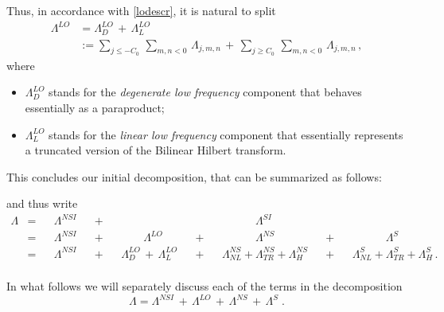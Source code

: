 \documentclass[a4paper,reqno]{amsart}
\numberwithin{equation}{section}
\theoremstyle{definition}
\def\L{\Lambda}
\begin{document}
Thus, in accordance with \eqref{lodescr}, it is natural to split
\begin{align}
\L^{LO} &=\L^{LO}_{D}\,+\,\L^{LO}_L\label{llo}\\[1ex]
&:=\sum_{j\le -C_0}\,\sum_{m,n<0}\, \L_{j,m,n}\,+\,\sum_{j\ge C_0}\,\sum_{m,n<0}\, \L_{j,m,n}\,,\nonumber
\end{align}
where
\begin{itemize}
\item $\L^{LO}_{D}$ stands for the \emph{degenerate low frequency} component that behaves essentially as a paraproduct;

\item $\L^{LO}_{L}$ stands for the \emph{linear low frequency} component that essentially represents a truncated version of the Bilinear Hilbert transform.
\end{itemize}

This concludes our initial decomposition, that can be summarized as follows:
\begin{center}
\end{center}
\if
and thus write
\begin{align}\label{keydeclnl}
	\L&=& &\L^{NSI}& &+& &\qquad\phantom{\L^{SI}}& &\phantom{+}& &\qquad\quad\L^{SI}& &\phantom{+}&  &\qquad\quad\phantom{\L^S}&\nonumber\\
	\,&=& &\L^{NSI}& &+& &\qquad\L^{LO}& &+& &\qquad\quad\L^{NS}& &+&  &\qquad\quad\L^S&\nonumber\\
	\,&=&&\L^{NSI}& &+&  &\L^{LO}_D\,+\,\L^{LO}_{L}&   &+& &\L^{NS}_{NL}+ \L^{NS}_{TR}+\L^{NS}_{H}& &+& &\L^S_{NL}+ \L^S_{TR}+\L^S_{H}\,.&\nonumber\\
\end{align}
\fi

In what follows we will separately discuss each of the terms in the decomposition
\begin{equation}
	\L=\L^{NSI}\,+\,\L^{LO}\,+\,\L^{NS}\,+\,\L^S\;.
\end{equation}
\end{document}
